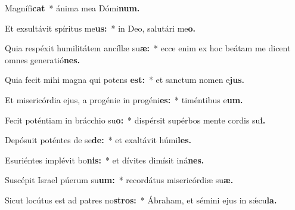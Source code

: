 \item Magnífi\textbf{cat}~* ánima mea Dómi\textbf{num.}
\item Et exsultávit spíritus me\textbf{us:}~* in Deo, salutári me\textbf{o.}
\item Quia respéxit humilitátem ancíllæ su\textbf{æ:}~* ecce enim ex hoc beátam me dicent omnes generatió\textbf{nes.}
\item Quia fecit mihi magna qui potens \textbf{est:}~* et sanctum nomen e\textbf{jus.}
\item Et misericórdia ejus, a progénie in progéni\textbf{es:}~* timéntibus e\textbf{um.}
\item Fecit poténtiam in brácchio su\textbf{o:}~* dispérsit supérbos mente cordis su\textbf{i.}
\item Depósuit poténtes de se\textbf{de:}~* et exaltávit húmi\textbf{les.}
\item Esuriéntes implévit bo\textbf{nis:}~* et dívites dimísit iná\textbf{nes.}
\item Suscépit Israel púerum su\textbf{um:}~* recordátus misericórdiæ su\textbf{æ.}
\item Sicut locútus est ad patres no\textbf{stros:}~* Ábraham, et sémini ejus in sǽcu\textbf{la.}